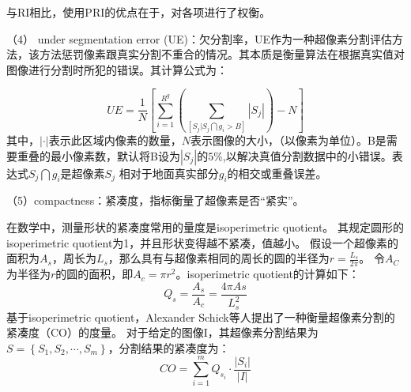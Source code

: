 与RI相比，使用PRI的优点在于，对各项进行了权衡。

（4） under segmentation error (UE)：欠分割率，UE作为一种超像素分割评估方法，该方法惩罚像素跟真实分割不重合的情况。其本质是衡量算法在根据真实值对图像进行分割时所犯的错误。其计算公式为：

\begin{equation}
UE = \frac{1}{N}\left [ \sum_{i=1}^{R^{g}}(\sum_{\left [ S_{j}|S_{j} \bigcap g_{i}> B \right ]}
\left | S_{j} \right |   )-N   \right ]
\end{equation}
其中，$\left | \cdot \right |$表示此区域内像素的数量，$N$表示图像的大小，（以像素为单位）。B是需要重叠的最小像素数，默认将B设为$\left | S_{j} \right |$的$5\%$,以解决真值分割数据中的小错误。表达式$S_{j} \bigcap g_{i}$是超像素$S_{j}$ 相对于地面真实部分$g_{i}$的相交或重叠误差。

（5）compactness：紧凑度，指标衡量了超像素是否“紧实”。

在数学中，测量形状的紧凑度常用的量度是isoperimetric quotient。
其规定圆形的isoperimetric quotient为1，并且形状变得越不紧凑，值越小。
假设一个超像素的面积为$A_{s}$，周长为$L_{s}$，那么具有与超像素相同的周长的圆的半径为$r = \frac{L_{s}}{2\pi}$。
令$A_C$为半径为$r$的圆的面积，即$A_{c}=\pi r^{2}$。isoperimetric quotient的计算如下：
\begin{equation}
Q_{s} = \frac{A_{s}}{A_{c}} = \frac{4\pi A{s}}{L_{s}^{2}}
\end{equation}
基于isoperimetric quotient，Alexander Schick等人提出了一种衡量超像素分割的紧凑度（CO）的度量。 对于给定的图像I，其超像素分割结果为$S = \left \{ S_{1},S_{2},\cdots ,S_{m} \right \}$，分割结果的紧凑度为：
\begin{equation}
CO=\sum_{i=1}^{m}Q_{s_{i}}\cdot \frac{\left | S_{i}\right |}{\left | I\right |}
\end{equation}

